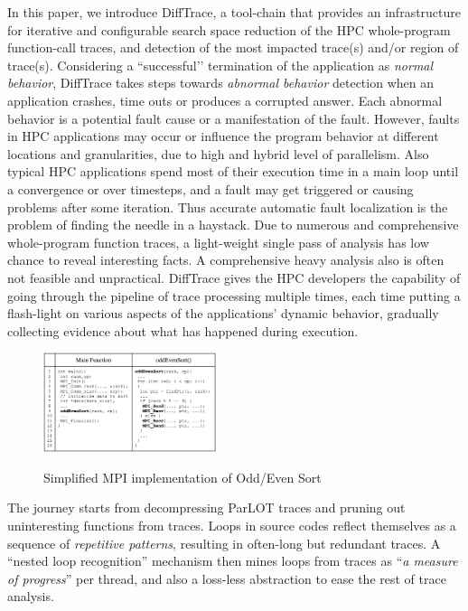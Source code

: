 In this paper, we introduce DiffTrace, a tool-chain that provides an infrastructure for iterative and configurable search space reduction of the HPC whole-program function-call traces, and detection of the most impacted trace(s) and/or region of trace(s).
%
Considering a ``successful’’ termination of the application as \textit{normal behavior}, DiffTrace takes steps towards \textit{abnormal behavior} detection when an application crashes, time outs or produces a corrupted answer.
%
Each abnormal behavior is a potential fault cause or a manifestation of the fault.
%
However, faults in HPC applications may occur or influence the program behavior at different locations and granularities, due to high and hybrid level of parallelism.
%
Also typical HPC applications spend most of their execution time in a main loop until a convergence or over timesteps, and a fault may get  triggered or causing problems after some iteration.
%
Thus accurate automatic fault localization is the problem of finding the needle in a haystack.
%
Due to numerous and comprehensive whole-program function traces, a light-weight single pass of analysis has low chance to reveal interesting facts. A comprehensive heavy analysis also is often not feasible and unpractical.
%
DiffTrace gives the HPC developers the capability of going through the pipeline of trace processing multiple times, each time putting a flash-light on various aspects of the applications' dynamic behavior, gradually collecting evidence about what has happened during execution.
%
\begin{figure}[]
\centering
\caption{Simplified MPI implementation of Odd/Even Sort}
\includegraphics[width=0.45\textwidth]{figs/oddEven.png}
\label{fig.oddEven}
\end{figure}
%
The journey starts from decompressing ParLOT traces and pruning out uninteresting functions from traces. 
%
Loops in source codes reflect themselves as a sequence of \textit{repetitive patterns}, resulting in often-long but redundant traces. A ``nested loop  recognition'' mechanism then mines loops from traces as ``\textit{a measure of progress}'' per thread, and also a loss-less abstraction to ease the rest of trace analysis.

